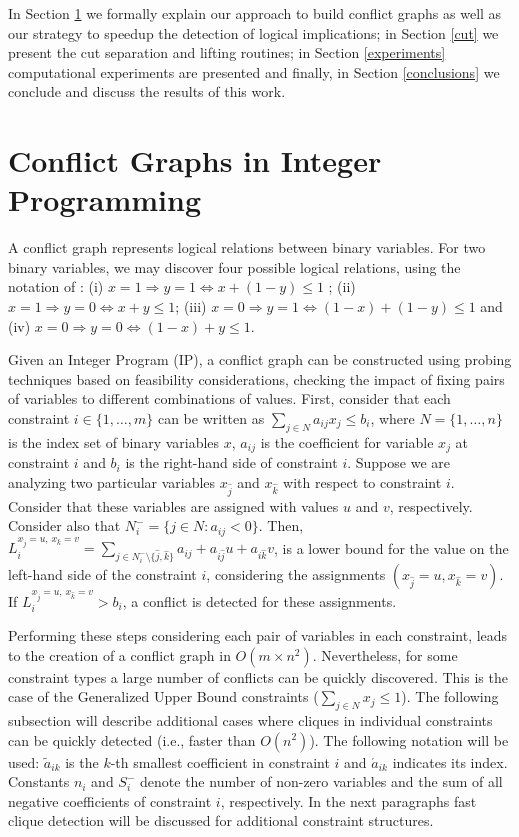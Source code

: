 \documentclass{endm}
\begin{document}
In Section \ref{seccgraph} we formally explain our approach to build conflict graphs as well as our strategy to speedup the detection of logical implications; in Section \ref{cut} we present the cut separation and lifting routines; in Section \ref{experiments} computational experiments are presented and finally, in Section \ref{conclusions} we conclude and discuss the results of this work.

\section{Conflict Graphs in Integer Programming}\label{seccgraph}

A conflict graph represents logical relations between binary variables. For two binary variables, we may discover four possible logical relations, using the notation of \cite{atamturk}: (i) $x = 1 \Rightarrow y = 1 \Longleftrightarrow x + (1 - y)  \leq 1$ ; (ii) $x=1 \Rightarrow y = 0 \Longleftrightarrow x + y \leq 1$; (iii) $x = 0 \Rightarrow y = 1 \Longleftrightarrow  (1 - x) + (1 - y) \leq 1$ and (iv) $x = 0 \Rightarrow y = 0 \Longleftrightarrow (1 - x) + y \leq 1$.

Given an Integer Program (IP), a conflict graph can be constructed using probing techniques based on feasibility considerations\cite{achterberg,atamturk}, checking the impact of fixing pairs of variables to different combinations of values. First, consider that each constraint $i \in \{1,\ldots,m\}$ can be written as $\displaystyle \sum_{j \in N} a_{ij}x_{j} \leq b_{i}$, where $N=\{1,\ldots,n\}$ is the index set of binary variables $x$, $a_{ij}$ is the coefficient for variable $x_{j}$ at constraint $i$ and $b_{i}$ is the right-hand side of constraint $i$. Suppose we are analyzing two particular variables $x_{\hat{j}}$ and $x_{\hat{k}}$ with respect to constraint $i$. Consider that these variables are assigned with values $u$ and $v$, respectively. Consider also that $N_{i}^{-} = \{j \in N : a_{ij} < 0\}$. Then, $\displaystyle
L_{i}^{x_{\hat{j}} = u,\, x_{\hat{k}} = v}=\sum_{j\in N_{i}^{-} \setminus \{\hat{j}, \hat{k}\}}a_{ij}+a_{i\hat{j}}u+a_{i\hat{k}}v $, is a lower bound for the value on the left-hand side  of the constraint $i$, considering the assignments $(x_{\hat{j}} =u,x_{\hat{k}}=v)$. If $L_{i}^{x_{\hat{j}} = u,\, x_{\hat{k}} = v} > b_{i}$, a conflict is detected for these assignments. 

Performing these steps considering each pair of variables in each constraint, leads to the creation of a conflict graph in $O(m \times n^2)$.  Nevertheless, for some constraint types a large number of conflicts can be quickly discovered. This is the case of the Generalized Upper Bound constraints ($\sum_{j\in N}x_j \leq 1$). The following subsection will describe additional cases where cliques in individual constraints can be quickly detected (i.e., faster than $O(n^2)$). The following notation will be used: $\tilde{a}_{ik}$ is the $k$-th smallest coefficient in constraint $i$ and $\acute{a}_{ik}$ indicates its index. Constants $n_i$ and $S_i^-$ denote the number of non-zero variables and the sum of all negative coefficients of constraint $i$, respectively. In the next paragraphs fast clique detection will be discussed for additional constraint structures. 
\end{document}
